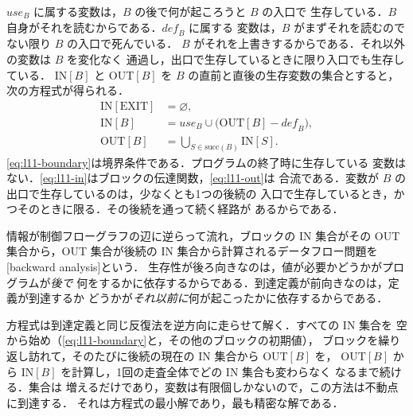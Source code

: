 \documentclass[../main.tex]{subfiles}
\begin{document}
%
$\mathit{use}_B$ に属する変数は，$B$ の後で何が起ころうと $B$ の入口で
生存している．$B$ 自身がそれを読むからである．$\mathit{def}_B$ に属する
変数は，$B$ がまずそれを読むのでない限り $B$ の入口で死んでいる．
$B$ がそれを上書きするからである．それ以外の変数は $B$ を変化なく
通過し，出口で生存しているときに限り入口でも生存している．
IN$[B]$ と OUT$[B]$ を $B$ の直前と直後の生存変数の集合とすると，
次の方程式が得られる．
\begin{align}
  \mathrm{IN}[\mathrm{EXIT}] &= \varnothing, \label{eq:l11-boundary}\\
  \mathrm{IN}[B] &= \mathit{use}_B \cup
     \bigl(\mathrm{OUT}[B] - \mathit{def}_B\bigr), \label{eq:l11-in}\\
  \mathrm{OUT}[B] &= \bigcup_{S \in \mathrm{succ}(B)} \mathrm{IN}[S].
     \label{eq:l11-out}
\end{align}
%
\cref{eq:l11-boundary}は境界条件である．プログラムの終了時に生存している
変数はない．\cref{eq:l11-in}はブロックの伝達関数，\cref{eq:l11-out}は
合流である．変数が $B$ の出口で生存しているのは，少なくとも1つの後続の
入口で生存しているとき，かつそのときに限る．その後続を通って続く経路が
あるからである．

\begin{definition}[後ろ向き解析]
  \label{def:l11-backward}
  情報が制御フローグラフの辺に逆らって流れ，ブロックの IN 集合がその
  OUT 集合から，OUT 集合が後続の IN 集合から計算されるデータフロー問題を
  [backward analysis]という．
  生存性が後ろ向きなのは，値が必要かどうかがプログラムが\emph{後で}
  何をするかに依存するからである．到達定義が前向きなのは，定義が到達するか
  どうかが\emph{それ以前に}何が起こったかに依存するからである．
\end{definition}

方程式は到達定義と同じ反復法を逆方向に走らせて解く．すべての IN 集合を
空から始め（\cref{eq:l11-boundary}と，その他のブロックの初期値），
ブロックを繰り返し訪れて，そのたびに後続の現在の IN 集合から OUT$[B]$ を，
OUT$[B]$ から IN$[B]$ を計算し，1回の走査全体でどの IN 集合も変わらなく
なるまで続ける．集合は
増えるだけであり，変数は有限個しかないので，この方法は不動点に到達する．
それは方程式の最小解であり，最も精密な解である．
\end{document}

